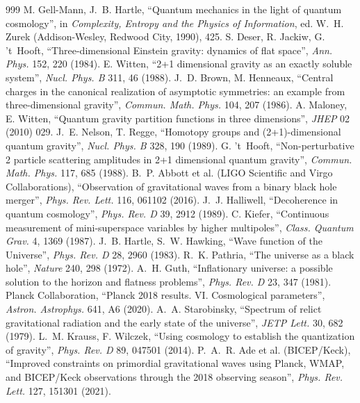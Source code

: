 \documentclass[11pt,a4paper]{article}
\theoremstyle{definition}
\theoremstyle{remark}
\theoremstyle{definition}
\begin{document}
\begin{thebibliography}{999}
 M. Gell-Mann, J.~B. Hartle, ``Quantum mechanics in the light of quantum cosmology'', in \emph{Complexity, Entropy
and the Physics of Information}, ed. W.~H. Zurek (Addison-Wesley, Redwood City, 1990), 425.
 S. Deser, R. Jackiw, G. 't~Hooft, ``Three-dimensional Einstein gravity: dynamics of flat space'', \emph{Ann. Phys.} 152, 220
(1984).
 E. Witten, ``2+1 dimensional gravity as an exactly soluble system'', \emph{Nucl. Phys. B} 311, 46 (1988).
 J.~D. Brown, M. Henneaux, ``Central charges in the canonical realization of asymptotic symmetries: an example from
three-dimensional gravity'', \emph{Commun. Math. Phys.} 104, 207 (1986).
 A. Maloney, E. Witten, ``Quantum gravity partition functions in three dimensions'', \emph{JHEP} 02 (2010) 029.
 J.~E. Nelson, T. Regge, ``Homotopy groups and (2+1)-dimensional quantum gravity'', \emph{Nucl. Phys. B} 328, 190 (1989).
 G. 't~Hooft, ``Non-perturbative 2 particle scattering amplitudes in 2+1 dimensional quantum gravity'',
\emph{Commun. Math. Phys.} 117, 685 (1988).
 B.~P. Abbott et al. (LIGO Scientific and Virgo Collaborations), ``Observation of gravitational waves from a binary black
hole merger'', \emph{Phys. Rev. Lett.} 116, 061102 (2016).
 J.~J. Halliwell, ``Decoherence in quantum cosmology'', \emph{Phys. Rev. D} 39, 2912 (1989).
 C. Kiefer, ``Continuous measurement of mini-superspace variables by higher multipoles'', \emph{Class. Quantum Grav.} 4,
1369 (1987).
 J.~B. Hartle, S.~W. Hawking, ``Wave function of the Universe'', \emph{Phys. Rev. D} 28, 2960 (1983).
 R.~K. Pathria, ``The universe as a black hole'', \emph{Nature} 240, 298 (1972).
 A.~H. Guth, ``Inflationary universe: a possible solution to the horizon and flatness problems'', \emph{Phys. Rev. D} 23, 347
(1981).
 Planck Collaboration, ``Planck 2018 results. VI. Cosmological parameters'', \emph{Astron. Astrophys.} 641, A6 (2020).
 A.~A. Starobinsky, ``Spectrum of relict gravitational radiation and the early state of the universe'', \emph{JETP
Lett.} 30, 682 (1979).
 L.~M. Krauss, F. Wilczek, ``Using cosmology to establish the quantization of gravity'', \emph{Phys. Rev. D} 89,
047501 (2014).
 P.~A.~R. Ade et al. (BICEP/Keck), ``Improved constraints on primordial gravitational waves using Planck, WMAP, and BICEP/Keck
observations through the 2018 observing season'', \emph{Phys. Rev. Lett.} 127, 151301 (2021).

\end{thebibliography}
\end{document}
